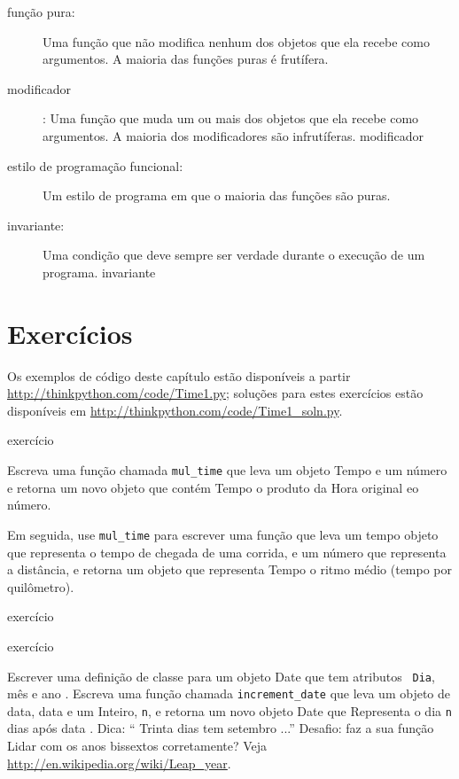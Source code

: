 \documentclass[10pt]{book}
\begin{document}
\begin{v erbatim}
{\begin{description}
\item[função pura:] Uma função que não modifica nenhum dos objetos que ela
recebe como argumentos. A maioria das funções puras é frutífera.

\item[modificador]: Uma função que muda um ou mais dos objetos que ela
recebe como argumentos. A maioria dos modificadores são infrutíferas.
\index{} modificador

\item[estilo de programação funcional:] Um estilo de programa em que o
maioria das funções são puras.

\item[invariante:] Uma condição que deve sempre ser verdade durante o
execução de um programa.
\index{} invariante

\end{description}


\section{Exercícios}

Os exemplos de código deste capítulo estão disponíveis a partir
\url{http://thinkpython.com/code/Time1.py}; soluções para estes
exercícios estão disponíveis em \url{http://thinkpython.com/code/Time1_soln.py}.

\begin{} exercício

Escreva uma função chamada \verb "mul_time" que leva um objeto Tempo
e um número e retorna um novo objeto que contém Tempo
o produto da Hora original eo número.

Em seguida, use \verb "mul_time" para escrever uma função que leva um tempo
objeto que representa o tempo de chegada de uma corrida, e um número
que representa a distância, e retorna um objeto que representa Tempo
o ritmo médio (tempo por quilômetro).

\end{} exercício

\begin{} exercício

Escrever uma definição de classe para um objeto Date que tem atributos {\tt
Dia}, {mês \tt} e {ano \tt}. Escreva uma função chamada
\Verb "increment_date" que leva um objeto de data, {data \tt} e um
Inteiro, {\tt n}, e retorna um novo objeto Date que
Representa o dia {\tt n} dias após {data \tt}. Dica:
`` Trinta dias tem setembro ...'' Desafio: faz a sua função
Lidar com os anos bissextos corretamente? Veja \url{http://en.wikipedia.org/wiki/Leap_year}.


\end{}}
\end{v erbatim}
\end{document}
